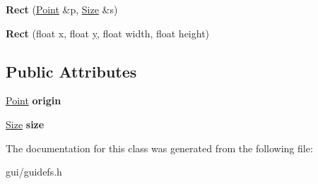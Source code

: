 \begin{DoxyCompactItemize}
\item 
{\bfseries Rect} (\hyperlink{classPoint}{Point} \&p, \hyperlink{structSize}{Size} \&s)\hypertarget{classRect_a96820dacf39ec1f0abd67cf3395dd6f6}{}\label{classRect_a96820dacf39ec1f0abd67cf3395dd6f6}

\item 
{\bfseries Rect} (float x, float \hyperlink{IceUtils_8h_aa7ffaed69623192258fb8679569ff9ba}{y}, float width, float height)\hypertarget{classRect_a2ccad9ce15ee46a8957448a0bafbb8e9}{}\label{classRect_a2ccad9ce15ee46a8957448a0bafbb8e9}

\end{DoxyCompactItemize}
\subsection*{Public Attributes}
\begin{DoxyCompactItemize}
\item 
\hyperlink{classPoint}{Point} {\bfseries origin}\hypertarget{classRect_ad289113ea5fb043950a0c1af559d0bfc}{}\label{classRect_ad289113ea5fb043950a0c1af559d0bfc}

\item 
\hyperlink{structSize}{Size} {\bfseries size}\hypertarget{classRect_a997eb36f3e6c8c4428839a1550f2e4e1}{}\label{classRect_a997eb36f3e6c8c4428839a1550f2e4e1}

\end{DoxyCompactItemize}


The documentation for this class was generated from the following file\+:\begin{DoxyCompactItemize}
\item 
gui/guidefs.\+h\end{DoxyCompactItemize}
